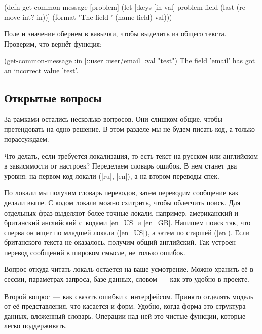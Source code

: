 \begin{english}
  \begin{clojure}
(defn get-common-message [problem]
  (let [{:keys [in val]} problem
        field (last (remove int? in))]
    (format "The field '%
            (name field) val)))
  \end{clojure}
\end{english}

Поле и значение обернем в кавычки, чтобы выделить из общего текста. Проверим,
что верн\"{е}т функция:

\begin{english}
  \begin{clojure}
(get-common-message {:in [::user :user/email] :val "test"})
The field 'email' has got an incorrect value 'test'.
  \end{clojure}
\end{english}

\subsection{Открытые вопросы}

За рамками остались несколько вопросов. Они слишком общие, чтобы претендовать на
одно решение. В этом разделе мы не будем писать код, а только порассуждаем.

Что делать, если требуется локализация, то есть текст на русском или английском
в зависимости от настроек? Переделаем словарь ошибок. В нем станет два уровня:
на первом код локали (\spverb|ru|, \spverb|en|), а на втором переводы спек.


По локали мы получим словарь переводов, затем переводим сообщение как делали
выше. С кодом локали можно схитрить, чтобы облегчить поиск. Для отдельных фраз
выделяют более точные локали, например, американский и британский английский
с~кодами \spverb|en_US| и \spverb|en_GB|. Напишем поиск так, что сперва он ищет
по младшей локали (\spverb|en_US|), а затем по старшей (\spverb|en|). Если
британского текста не оказалось, получим общий английский. Так устроен перевод
сообщений в широком смысле, не только ошибок.

Вопрос откуда читать локаль остается на ваше усмотрение. Можно хранить е\"{е} в
сессии, параметрах запроса, базе данных, словом~--- как это удобно в проекте.

Второй вопрос~--- как связать ошибки с интерфейсом. Принято отделять модель от
е\"{е} представления, что касается и форм. Удобно, когда форма это структура данных,
вложенный словарь. Операции над ней это чистые функции, которые легко
поддерживать.

